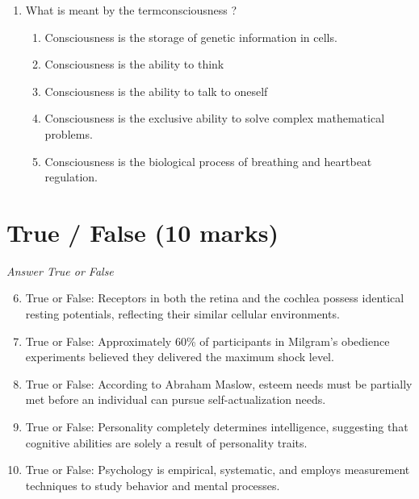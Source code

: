 \documentclass[12pt]{article}
\begin{document}
\begin{enumerate}[label=\arabic*.]
\begin{enumerate}[label=(\alph*)]
    \item Family members are dealing with the loss of a loved one.
    \item Family members attribute their problems to one of the members.
    \item The presenting problem involves sibling rivalry.
    \item The family has recently moved to a new city.
\end{enumerate}
\item What is meant by the termconsciousness ?
\begin{enumerate}[label=(\alph*)]
    \item Consciousness is the storage of genetic information in cells.
    \item Consciousness is the ability to think
    \item Consciousness is the ability to talk to oneself
    \item Consciousness is the exclusive ability to solve complex mathematical problems.
    \item Consciousness is the biological process of breathing and heartbeat regulation.
\end{enumerate}
\end{enumerate}

\section*{True / False (10 marks)}
\textit{Answer True or False}
\begin{enumerate}[label=\arabic*.]
\setcounter{enumi}{5}
\item True or False: Receptors in both the retina and the cochlea possess identical resting potentials, reflecting their similar cellular environments.
\item True or False: Approximately 60\% of participants in Milgram's obedience experiments believed they delivered the maximum shock level.
\item True or False: According to Abraham Maslow, esteem needs must be partially met before an individual can pursue self-actualization needs.
\item True or False: Personality completely determines intelligence, suggesting that cognitive abilities are solely a result of personality traits.
\item True or False: Psychology is empirical, systematic, and employs measurement techniques to study behavior and mental processes.
\end{enumerate}
\end{document}
